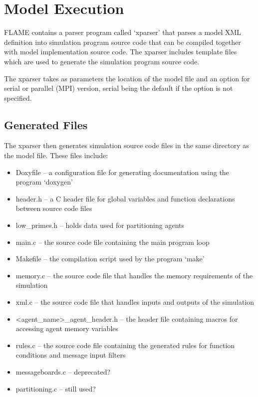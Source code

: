 \section{Model Execution}
\label{model_execution}

FLAME contains a parser program called `xparser' that parses a model
XML definition into simulation program source code that can be compiled
together with model implementation source code. The xparser includes
template files which are used to generate the simulation program source code.

The xparser takes as parameters the location of the model file and an option
for serial or parallel (MPI) version, serial being the default if the option is
not specified.

\subsection{Generated Files}

The xparser then generates simulation source code files in the same directory
as the model file. These files include:

\begin{itemize}
  \item Doxyfile -- a configuration file for generating documentation using
 the program `doxygen'
  \item header.h -- a C header file for global variables and function
  declarations between source code files
  \item low\_primes.h -- holds data used for partitioning agents
  \item main.c -- the source code file containing the main program loop
  \item Makefile -- the compilation script used by the program `make'
  \item memory.c -- the source code file that handles the memory requirements
  of the simulation
  \item xml.c -- the source code file that handles inputs and outputs of the
  simulation
  \item <agent\_name>\_agent\_header.h -- the header file containing macros for
  accessing agent memory variables
  \item rules.c -- the source code file containing the generated rules for
  function conditions and message input filters
  \item messageboards.c -- deprecated?
  \item partitioning.c -- still used?
\end{itemize}

